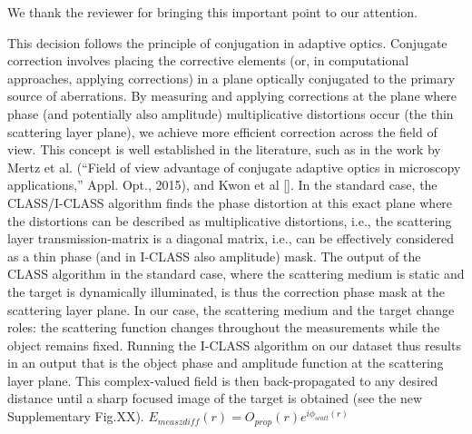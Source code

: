 \documentclass[12pt]{article}
\newcommand{\hlred}[1]{\sethlcolor{red!30}\hl{#1}}
\newenvironment{ourresponse}
    {\begin{tcolorbox}[width=\linewidth,breakable,enhanced,colback=gray!5,colframe=responsecolor!50,title=Response,left=5pt,right=5pt]}
    {\end{tcolorbox}}
\begin{document}
\begin{enumerate}[label=\arabic*.]
\begin{ourresponse}

        
    \end{ourresponse}

    \begin{ourresponse}
        We thank the reviewer for bringing this important point to our attention.
        
        This decision follows the principle of conjugation in adaptive optics. Conjugate correction involves placing the corrective elements (or, in computational approaches, applying corrections) in a plane optically conjugated to the primary source of aberrations. By measuring and applying corrections at the plane where phase (and potentially also amplitude) multiplicative distortions occur (the thin scattering layer plane), we achieve more efficient correction across the field of view. This concept is well established in the literature, such as in the work by Mertz et al. (``Field of view advantage of conjugate adaptive optics in microscopy applications,'' Appl. Opt., 2015), and Kwon et al [].
        In the standard case, the CLASS/I-CLASS algorithm finds the phase distortion at this exact plane where the distortions can be described as multiplicative distortions, i.e., the scattering layer transmission-matrix is a diagonal matrix, i.e., can be effectively considered as a thin phase (and in I-CLASS also amplitude) mask. The output of the CLASS algorithm in the standard case, where the scattering medium is static and the target is dynamically illuminated, is thus the correction phase mask at the scattering layer plane. 
        In our case, the scattering medium and the target change roles: the scattering function changes throughout the measurements while the object remains fixed. Running the I-CLASS algorithm on our dataset thus results in an output that is the object phase and amplitude function at the scattering layer plane. This complex-valued field is then back-propagated to any desired distance until a sharp focused image of the target is obtained (see the new Supplementary Fig.XX).
        \textbf{$E_{meas zdiff}(r)=O_{prop}(r)e^{i\phi_{scatt}(r)}$}


\end{ourresponse}
\end{enumerate}
\end{document}
